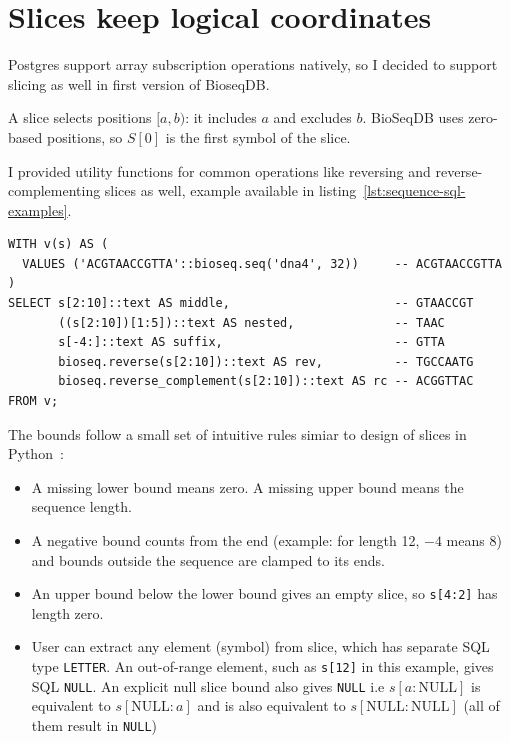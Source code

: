 \section{Slices keep logical coordinates}
\label{sec:sequence-sql-slicing}

Postgres support array subscription operations natively, so I decided to support slicing as well in first version of BioseqDB.

A slice selects positions \([a,b)\): it includes \(a\) and excludes \(b\).
BioSeqDB uses zero-based positions, so \(S[0]\) is the first symbol of the slice.


I provided utility functions for common operations like reversing and reverse-complementing slices as well, example available in listing~\ref{lst:sequence-sql-examples}.
\begin{lstlisting}[style=seq-nine-sql,
  caption={Zero-based slices and sequence transforms in SQL.},
  label={lst:sequence-sql-examples}]
WITH v(s) AS (
  VALUES ('ACGTAACCGTTA'::bioseq.seq('dna4', 32))     -- ACGTAACCGTTA
)
SELECT s[2:10]::text AS middle,                       -- GTAACCGT
       ((s[2:10])[1:5])::text AS nested,              -- TAAC
       s[-4:]::text AS suffix,                        -- GTTA
       bioseq.reverse(s[2:10])::text AS rev,          -- TGCCAATG
       bioseq.reverse_complement(s[2:10])::text AS rc -- ACGGTTAC
FROM v;
\end{lstlisting}

The bounds follow a small set of intuitive rules simiar to design of slices in Python~\cite{python_common_sequence_operations}:
\begin{itemize}
  \item A missing lower bound means zero. A missing upper bound means the
        sequence length.
  \item A negative bound counts from the end (example: for length 12, \(-4\) means 8) and bounds outside the sequence are clamped to its ends.
  \item An upper bound below the lower bound gives an empty slice, so \texttt{s[4:2]} has length zero.
  \item User can extract any element (symbol) from slice, which has separate SQL type \texttt{LETTER}. An out-of-range element, such as \texttt{s[12]} in this example,
        gives SQL \texttt{NULL}. An explicit null slice bound also gives \texttt{NULL} i.e $s[a:\text{NULL}]$ is equivalent to $s[\text{NULL}:a]$ and is also equivalent to $s[\text{NULL}:\text{NULL}]$ (all of them result in \texttt{NULL})
\end{itemize}

